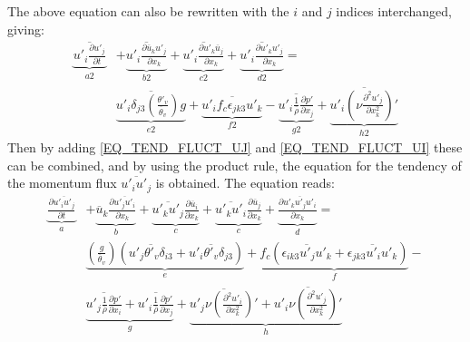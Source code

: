 \documentclass[10pt]{article}
\begin{document}
The above equation can also be rewritten with the $i$ and $j$ indices interchanged, giving:
\begin{equation}
\begin{split}
  \underbrace{ \overline{u'_i \frac{\partial u'_j}{\partial t}} }_{a2} & +
  \underbrace{ \overline{u'_i \frac{\partial \overline{u}_k u'_j}{\partial{x_k}}} }_{b2} +
  \underbrace{ \overline{u'_i \frac{\partial u'_k  \overline{u}_j}{\partial{x_k}}} }_{c2} +
  \underbrace{ \overline{u'_i \frac{\partial u'_k u'_j}{\partial{x_k}}} }_{d2} = \\
  &
  \underbrace{ \overline{u'_i \delta_{j3} \left( \frac{\theta'_v}{\overline{\theta}_v} \right) g} }_{e2} +
  \underbrace{ \overline{u'_i  f_c \epsilon_{jk3} u'_k} }_{f2} -
  \underbrace{ \overline{u'_i \frac{1}{\overline{\rho}} \frac{\partial p'}{\partial x_j}} }_{g2} + 
  \underbrace{ \overline{u'_i \left(\nu \frac{\partial^2 u'_j}{\partial x^2_k}\right)'} }_{h2}  
  \label{EQ_TEND_FLUCT_UI}
\end{split}
\end{equation}
Then by adding \ref{EQ_TEND_FLUCT_UJ} and \ref{EQ_TEND_FLUCT_UI} these can be combined, 
and by using the product rule, the equation for the tendency of the momentum flux $\overline{u'_i u'_j}$ is obtained. The equation reads:
\begin{equation}
\begin{split}
  \underbrace{\frac{\partial \overline{u'_i u'_j}}{\partial t}}_a & +
  \underbrace{\overline{u}_k \frac{\partial \overline{u'_j u'_i}}{\partial{x_k}}
             }_b +
  \underbrace{\overline{u'_k u'_j} \frac{\partial \overline{u}_i}{\partial{x_k}}
             }_c +
  \underbrace{\overline{u'_k u'_i} \frac{\partial \overline{u}_j}{\partial{x_k}}
             }_c +
  \underbrace{\frac{\partial \overline{u'_k u'_j u'_i}}{\partial{x_k}}
             }_d = \\
  &
  \underbrace{\left( \frac{g}{\overline{\theta}_v} \right) 
              \left(\overline{u'_j \theta'_v \delta_{i3} } + \overline{u'_i \theta'_v \delta_{j3} } \right)
             }_e +
  \underbrace{ f_c \left(
              \overline{\epsilon_{ik3} u'_j  u'_k} + \overline{\epsilon_{jk3} u'_i  u'_k} \right)
             }_f - \\
  &
  \underbrace{
              \overline{u'_j \frac{1}{\overline{\rho}} \frac{\partial p'}{\partial x_i}} +
              \overline{u'_i \frac{1}{\overline{\rho}} \frac{\partial p'}{\partial x_j}}
             }_g + 
  \underbrace{ \overline{u'_j \nu \left(\frac{\partial^2 u'_i}{\partial x^2_k}\right)'}+ \overline{u'_i \nu \left(\frac{\partial^2 u'_j}{\partial x^2_k}\right)'}}_h 
  \label{EQ_TEND_FLUCT_UI_PARTS}
\end{split}
\end{equation}
\end{document}
